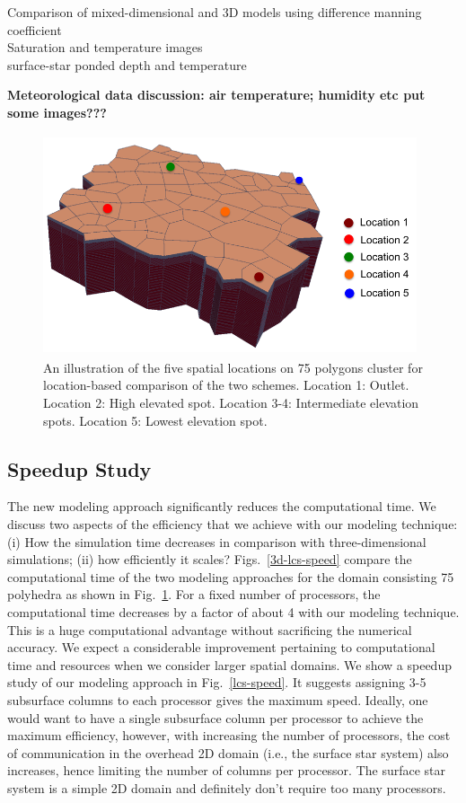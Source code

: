 \documentclass[review]{elsarticle}
\begin{document}
Comparison of mixed-dimensional and 3D models using difference manning coefficient \\
Saturation and temperature images\\
surface-star ponded depth and temperature

\textbf{Meteorological data discussion: air temperature; humidity etc put some images???}

 \begin{figure}[!htpb]
\centering
\includegraphics[height = 6.5cm, width=11cm]{figures/lobster75-3d.png}
\caption{An illustration of the five spatial locations on 75 polygons cluster for location-based comparison of the two schemes. Location 1: Outlet. Location 2: High elevated spot. Location 3-4: Intermediate elevation spots. Location 5: Lowest elevation spot.}
\label{surf-location}
\end{figure}

\subsection{Speedup Study}
The new modeling approach significantly reduces the computational time. We discuss two aspects of the efficiency that we achieve with our modeling technique: (i) How the simulation time decreases in comparison with three-dimensional simulations; (ii) how efficiently it scales? Figs.~\ref{3d-lcs-speed} compare the computational time of the two modeling approaches for the domain consisting 75 polyhedra as shown in Fig.~\ref{surf-location}.
For a fixed number of processors, the computational time decreases by a factor of about 4 with our modeling technique. This is a huge computational advantage without sacrificing the numerical accuracy. We expect a considerable improvement pertaining to computational time and resources when we consider larger spatial domains. We show a speedup study of our modeling approach in Fig.~\ref{lcs-speed}. It suggests assigning 3-5 subsurface columns to each processor gives the maximum speed. Ideally, one would want to have a single subsurface column per processor to achieve the maximum efficiency, however, with increasing the number of processors, the cost of communication in the overhead 2D domain (i.e., the surface star system) also increases, hence limiting the number of columns per processor. The surface star system is a simple 2D domain and definitely don't require too many processors. 
 
\end{document}
